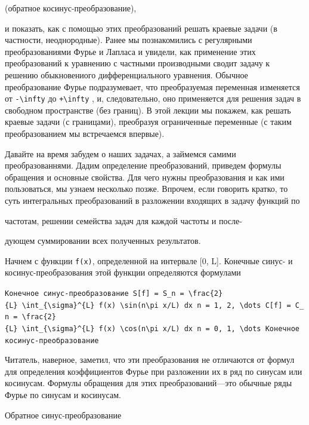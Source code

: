 \documentclass[
  ukrainian,
]{article}
\begin{document}
(обратное косинус-преобразование),

и показать, как с помощью этих преобразований решать краевые задачи (в
частности, неоднородные). Ранее мы познакомились с регулярными
преобразованиями Фурье и Лапласа и увидели, как применение этих
преобразований к уравнению с частными производными сводит задачу к
решению обыкновениого дифференциального уравнения. Обычное
преобразование Фурье подразумевает, что преобразуемая переменная
изменяется от \texttt{-\textbackslash{}infty} до
\texttt{+\textbackslash{}infty} , и, следовательно, оно применяется для
решения задач в свободном пространстве (без границ). В этой лекции мы
покажем, как решать краевые задачи (с границами), преобразуя
ограниченные переменные (с таким преобразованием мы встречаемся
впервые).

Давайте на время забудем о наших задачах, а займемся самими
преобразованнями. Дадим определение преобразований, приведем формулы
обращения и основные свойства. Для чего нужны преобразования и как ими
пользоваться, мы узнаем несколько позже. Впрочем, если говорить кратко,
то суть интегральных преобразований в разложении входящих в задачу
функций по

частотам, решении семейства задач для каждой частоты и после-

дующем суммировании всех полученных результатов.

Начнем с функции \texttt{f(x)}, определенной на интервале {[}0, L{]}.
Конечные синус- и косинус-преобразования этой функции определяются
формулами

\texttt{Конечное\ синус-преобразование\ \textquotesingle{}S{[}f{]}\ =\ S\_n\ =\ \textbackslash{}frac\{2\}\{L\}\ \textbackslash{}int\_\{\textbackslash{}sigma\}\^{}\{L\}\ f(x)\ \textbackslash{}sin(n\textbackslash{}pi\ x/L)\ dx\textquotesingle{}\ \textquotesingle{}n\ =\ 1,\ 2,\ \textbackslash{}dots\textquotesingle{}\ \textquotesingle{}C{[}f{]}\ =\ C\_n\ =\ \textbackslash{}frac\{2\}\{L\}\ \textbackslash{}int\_\{\textbackslash{}sigma\}\^{}\{L\}\ f(x)\ \textbackslash{}cos(n\textbackslash{}pi\ x/L)\ dx\textquotesingle{}\ \textquotesingle{}n\ =\ 0,\ 1,\ \textbackslash{}dots\textquotesingle{}\ Конечное\ косинус-преобразование}

Читатель, наверное, заметил, что эти преобразования не отличаются от
формул для определения коэффициентов Фурье при разложении их в ряд по
синусам или косинусам. Формулы обращения для этих преобразований---это
обычные ряды Фурье по синусам и косинусам.

Обратное синус-преобразование
\end{document}

